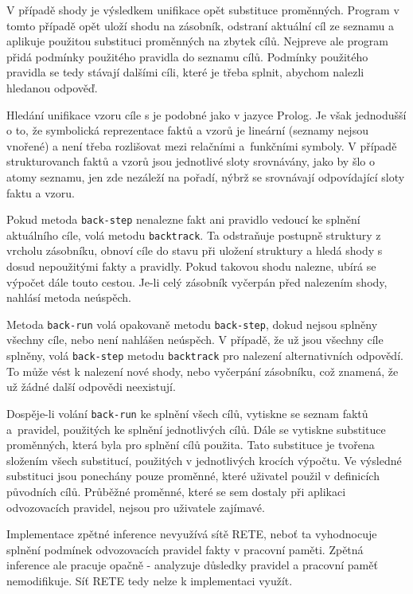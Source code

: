 V případě shody je výsledkem unifikace opět substituce proměnných. Program v
tomto případě opět uloží shodu na zásobník, odstraní aktuální cíl ze seznamu a
aplikuje použitou substituci proměnných na zbytek cílů. Nejpreve ale program
přidá podmínky použitého pravidla do seznamu cílů. Podmínky použitého pravidla
se tedy stávají dalšími cíli, které je třeba splnit, abychom nalezli hledanou
odpověď.

Hledání unifikace vzoru cíle s  je podobné jako v jazyce
Prolog. Je však jednodušší o to, že symbolická reprezentace faktů a vzorů je
lineární (seznamy nejsou vnořené) a není třeba rozlišovat mezi relačními
a~funkčními symboly. V případě strukturovanch faktů a vzorů jsou jednotlivé
sloty srovnávány, jako by šlo o atomy seznamu, jen zde nezáleží na pořadí, nýbrž
se srovnávají odpovídající sloty faktu a vzoru.

Pokud metoda \verb|back-step| nenalezne fakt ani pravidlo vedoucí ke splnění
aktuálního cíle, volá metodu \verb|backtrack|. Ta odstraňuje postupně struktury z
vrcholu zásobníku, obnoví cíle do stavu při uložení struktury a hledá shody s
dosud nepoužitými fakty a pravidly. Pokud takovou shodu nalezne, ubírá se
výpočet dále touto cestou. Je-li celý zásobník vyčerpán před nalezením shody,
nahlásí metoda neúspěch.

Metoda \verb|back-run| volá opakovaně metodu \verb|back-step|, dokud nejsou
splněny všechny cíle, nebo není nahlášen neúspěch. V případě, že už jsou všechny
cíle splněny, volá \verb|back-step| metodu \verb|backtrack| pro nalezení
alternativních odpovědí. To může vést k nalezení nové shody, nebo vyčerpání
zásobníku, což znamená, že už žádné další odpovědi neexistují.

Dospěje-li volání \verb|back-run| ke splnění všech cílů, vytiskne se seznam
faktů a~pravidel, použitých ke splnění jednotlivých cílů. Dále se vytiskne
substituce proměnných, která byla pro splnění cílů použita. Tato substituce je
tvořena složením všech substitucí, použitých v jednotlivých krocích výpočtu. Ve
výsledné substituci jsou ponechány pouze proměnné, které uživatel použil v
definicích původních cílů. Průběžné proměnné, které se sem dostaly při aplikaci
odvozovacích pravidel, nejsou pro uživatele zajímavé.

Implementace zpětné inference nevyužívá sítě RETE, neboť ta vyhodnocuje splnění
podmínek odvozovacích pravidel fakty v pracovní paměti. Zpětná inference ale
pracuje opačně - analyzuje důsledky pravidel a pracovní paměť nemodifikuje. Síť
RETE tedy nelze k implementaci využít.

